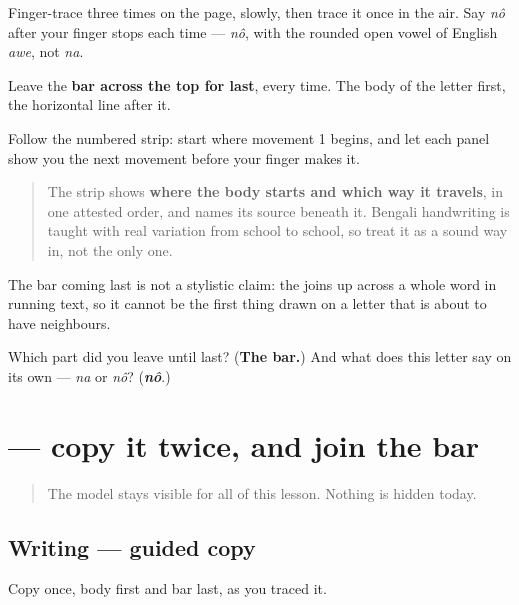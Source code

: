 Finger-trace \textbf{} three times on the page, slowly, then trace it once in the air. Say \emph{nô} after your finger stops each time — \emph{nô}, with the rounded open vowel of English \emph{awe}, not \emph{na}.

Leave the \textbf{bar across the top for last}, every time. The body of the letter first, the horizontal line after it.

Follow the numbered strip: start where movement 1 begins, and let each panel show you the next movement before your finger makes it.

\begin{quote}
The strip shows \textbf{where the body starts and which way it travels}, in one attested order, and names its source beneath it. Bengali handwriting is taught with real variation from school to school, so treat it as a sound way in, not the only one.
\end{quote}

The bar coming last is not a stylistic claim: the \textbf{} joins up across a whole word in running text, so it cannot be the first thing drawn on a letter that is about to have neighbours.

\begin{tcolorbox}[breakable,colback=teal!4,colframe=teal!35!black,title={Before you move on}]
Which part did you leave until last? (\textbf{The bar.}) And what does this letter say on its own — \emph{na} or \emph{nô}? (\emph{\textbf{nô}}.)
\end{tcolorbox}
\section[\texorpdfstring{\bn{ন} (nô)}{ন (nô)}]{ — copy it twice, and join the bar}

\label{lesson:BN-W01-na-guided-copy}



\begin{quote}
The model stays visible for all of this lesson. Nothing is hidden today.
\end{quote}

\subsection*{Writing — guided copy}

Copy \textbf{} once, body first and bar last, as you traced it.

